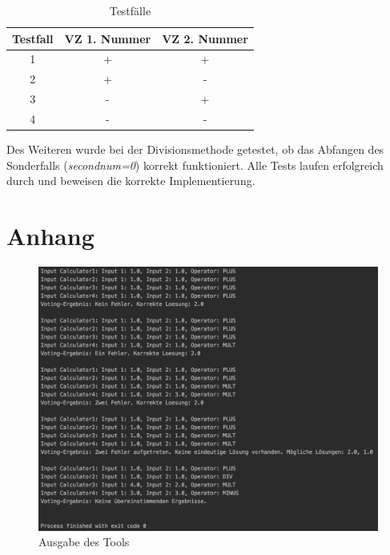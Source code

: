 \begin{table}[H]
\centering
\begin{tabular}{c c c}
	Testfall & VZ 1. Nummer & VZ 2. Nummer\\
	\hline
	1 & + & +\\
	2 & + & -\\
	3 & - & +\\
	4 & - & -\\
\end{tabular}
\caption{Testfälle}
\end{table}

Des Weiteren wurde bei der Divisionsmethode getestet, ob das Abfangen des Sonderfalls (\textit{second\textunderscore num=0}) korrekt funktioniert. Alle Tests laufen erfolgreich durch und beweisen die korrekte Implementierung.

\chapter{Anhang}
\begin{figure}[H]
\centering
\includegraphics[width=1\textwidth]{images/tool_output.png}
\caption{Ausgabe des Tools}
\label{fig:output}
\end{figure}
